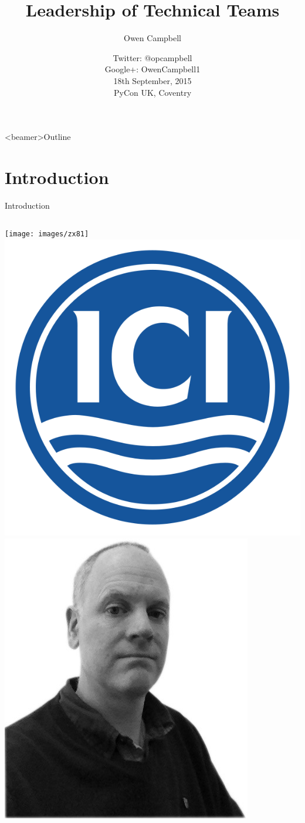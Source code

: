 \documentclass[14pt]{beamer}
\title{Leadership of Technical Teams}
\author{Owen Campbell}
\date[PyCon UK 2015]{
  Twitter: @opcampbell\\
  Google+: OwenCampbell1\\
  \vspace{1cm}
  18th September, 2015\\
  PyCon UK, Coventry}
\begin{document}
\begin{frame}
  \titlepage{}
\end{frame}

{
  \begin{frame}<beamer>{Outline}
    \tableofcontents
  \end{frame}
}

  \section{Introduction}

    \begin{frame}{Introduction}
    \pause
      \begin{columns}
          \texttt{[image: images/zx81]}
        \pause
          \includegraphics[scale=0.1]{images/ici}\\[2em]
          \includegraphics[scale=0.17]{images/owencampbell}

\end{columns}
\end{frame}
\end{document}

